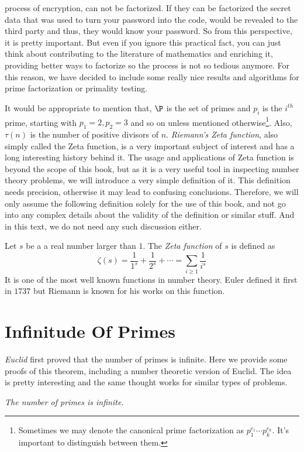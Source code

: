 \documentclass{subfiles}
\begin{document}
process of encryption, can not be factorized. If they can be factorized the secret data that was used to turn your password into the code, would be revealed to the third party and thus, they would know your password. So from this perspective, it is pretty important. But even if you ignore this practical fact, you can just think about contributing to the literature of mathematics and enriching it, providing better ways to factorize so the process is not so tedious anymore. For this reason, we have decided to include some really nice results and algorithms for prime factorization or primality testing.

	It would be appropriate to mention that, $\P $ is the set of primes and $p_i$ is the $i^{th}$ prime, starting with $p_1=2,p_2=3$ and so on unless mentioned otherwise\footnote{Sometimes we may denote the canonical prime factorization as $p_1^{e_1}\cdots p_k^{e_k}$. It's important to distinguish between them.}. Also, $\tau(n)$ is the number of positive divisors of $n$. \textit{Riemann's Zeta function}, also simply called the Zeta function, is a very important subject of interest and has a long interesting history behind it. The usage and applications of Zeta function is beyond the scope of this book, but as it is a very useful tool in inspecting number theory problems, we will introduce a very simple definition of it. This definition needs precision, otherwise it may lead to confusing conclusions. Therefore, we will only assume the following definition solely for the use of this book, and not go into any complex details about the validity of the definition or similar stuff. And in this text, we do not need any such discussion either.
		\begin{definition}
			Let $s$ be a a real number larger than $1$. The \textit{Zeta function} of $s$ is defined as
			\[\zeta(s)=\dfrac{1}{1^s}+\dfrac{1}{2^s}+\cdots=\sum_{i\geq1}\dfrac{1}{i^s}\]
			It is one of the most well known functions in number theory. Euler defined it first in $1737$ but Riemann is known for his works on this function.
		\end{definition}
	\section{Infinitude Of Primes}
	\label{sec:infiniteprimes}
	\textit{Euclid} first proved that the number of primes is infinite. Here we provide some proofs of this theorem, including a number theoretic version of Euclid. The idea is pretty interesting and the same thought works for similar types of problems.
		\begin{theorem}\sl
			The number of primes is infinite.
		\end{theorem}
\end{document}
